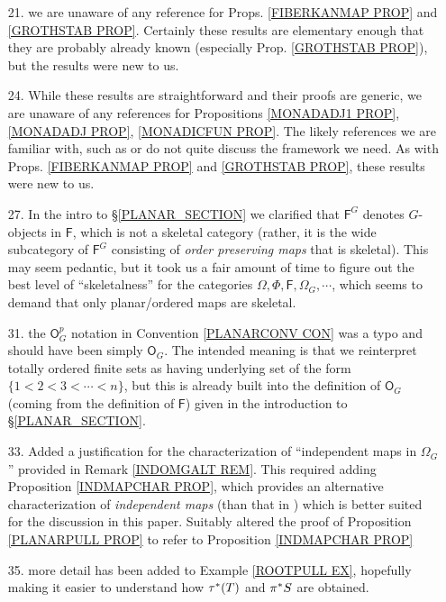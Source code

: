 \documentclass{article}
\begin{document}
\begin{itemize}
	\item[21.] we are unaware of any reference for Props. 
	\ref{FIBERKANMAP PROP} and \ref{GROTHSTAB PROP}.
	Certainly these results are elementary enough that they are probably already known (especially Prop. \ref{GROTHSTAB PROP}),
	but the results were new to us. 
	
	\item[24.] While these results are straightforward 
	and their proofs are generic, 
	we are unaware of any references for Propositions \ref{MONADADJ1 PROP}, \ref{MONADADJ PROP}, \ref{MONADICFUN PROP}. The likely references we are familiar with, such as 
	\cite{Bo94} or \cite{Ri17} do not quite discuss the framework we need.
	As with Props. 
	\ref{FIBERKANMAP PROP} and \ref{GROTHSTAB PROP},
	these results were new to us.
	
	\item[27.] In the intro to \S \ref{PLANAR_SECTION} we
	clarified that $\mathsf{F}^G$ denotes $G$-objects in $\mathsf{F}$,
	which is not a skeletal category (rather, it is the wide subcategory of $\mathsf{F}^G$ consisting of \emph{order preserving maps} that is skeletal).
	This may seem pedantic,
	but it took us a fair amount of time to figure out the best level of ``skeletalness'' for the categories 
	$\Omega, \Phi, \mathsf{F}, \Omega_G, \cdots$, 
	which seems to demand that only planar/ordered maps are skeletal.
	
	\item[31.] the $\mathsf{O}^p_G$ notation in 
	Convention \ref{PLANARCONV CON}
	was a typo and should have been simply $\mathsf{O}_G$.
	The intended meaning is that we reinterpret totally ordered finite sets as having underlying set of the form
	$\{1<2<3<\cdots <n\}$,
	but this is already built into the definition of 
	$\mathsf{O}_G$ (coming from the definition of $\mathsf F$) given in the introduction to
	\S \ref{PLANAR_SECTION}.

  \item[33.] Added a justification for 
	the characterization of ``independent maps in $\Omega_G$''
	provided in Remark \ref{INDOMGALT REM}.
	This required adding 
	Proposition \ref{INDMAPCHAR PROP},
	which provides an alternative characterization of \emph{independent maps}
	(than that in \cite[Def. 5.28]{Pe17})
	which is better suited for the discussion in this paper.
	Suitably altered the proof of Proposition \ref{PLANARPULL PROP}
	to refer to Proposition \ref{INDMAPCHAR PROP}
        
	\item[35.] more detail has been added to Example \ref{ROOTPULL EX}, hopefully making it easier to understand 
	how $\tau^{\**}(T)$ and $\pi^{\**}S$ are obtained.
	

\end{itemize}
\end{document}
